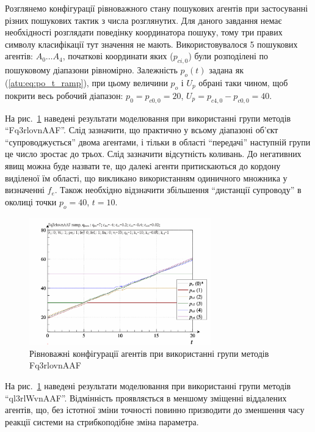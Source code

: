 \documentclass[a4paper,13pt]{atuaref}
\begin{document}
Розглянемо конфігурації рівноважного стану пошукових агентів при застосуванні
різних пошукових тактик з числа розглянутих. Для даного завдання немає
необхідності розглядати поведінку координатора пошуку, тому три правих символу
класифікації тут значення не мають.
Використовувалося 5 пошукових агентів: $ A_0 \ldots A_4 $, початкові
координати яких ($ p_ {ci,0} $) були розподілені по пошуковому діапазони
рівномірно. Залежність $ p_o (t) $ задана як (\ref{atu:eq:po_t_ramp}), при
цьому величини $ p_o $ і $ U_p $ обрані таки чином, щоб покрити весь робочий
діапазон: $ p_0 = p_{c0,0} = 20 $, $ U_p = p_ {c4,0} - p_ {c0,0} = 40 $.


На рис.~\ref{atu:f:qls_ramp_Fq3rlovnAAF} наведені результати моделювання при використанні групи методів
``Fq3rlovnAAF''. Слід зазначити, що практично у всьому діапазоні об'єкт
``супроводжується'' двома агентами, і тільки в області ``передачі'' наступній
групи це число зростає до трьох. Слід зазначити відсутність коливань. До
негативних явищ можна буде назвати те, що далекі агенти притискаються до
кордону виділеної їм області, що викликано використанням одиничного множника у
визначенні $ f_e $. Також необхідно відзначити збільшення
``дистанції супроводу'' в околиці точки $ p_o = 40 $, $ t = 10 $.

\begin{figure}[htb!]
  \centerline{
    \includegraphics[width=0.70\textwidth]{p3/p/ramp/qls-p_t_pi_Fq3rlovnAAF_ramp.png}
  }
  \caption{Рівноважні конфігурації агентів при використанні групи методів  Fq3rlovnAAF}
  \label{atu:f:qls_ramp_Fq3rlovnAAF}
\end{figure}

На рис.~\ref{atu:f:qls_ramp_Fq3rlovnAAF} наведені результати моделювання при використанні групи методів
``ql3rlWvnAAF''.
Відмінність проявляється в меншому зміщенні віддалених агентів, що, без
істотної зміни точності повинно призводити до зменшення часу реакції системи на
стрибкоподібне зміна параметра.
\end{document}
